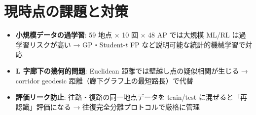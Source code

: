\documentclass[a4paper]{ltjsarticle}
\begin{document}
\section{現時点の課題と対策}

\begin{itemize}
  \item \textbf{小規模データの過学習}: 59 地点 × 10 回 × 48 AP では大規模 ML/RL は過学習リスクが高い
        → GP・Student-$t$ FP など説明可能な統計的機械学習で対応
  \item \textbf{L 字廊下の幾何的問題}: Euclidean 距離では壁越し点の疑似相関が生じる
        → corridor geodesic 距離（廊下グラフ上の最短路長）で代替
  \item \textbf{評価リーク防止}: 往路・復路の同一地点データを train/test に混ぜると「再認識」評価になる
        → 往復完全分離プロトコルで厳格に管理
\end{itemize}
\end{document}
